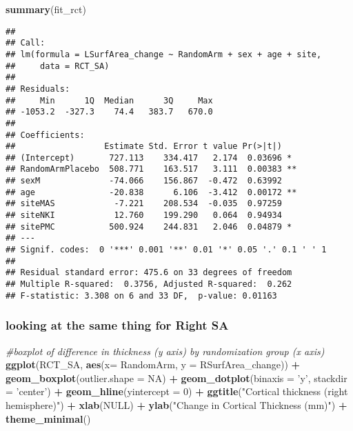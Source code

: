 \documentclass[]{article}
\newenvironment{Shaded}{\begin{snugshade}}{\end{snugshade}}
\newcommand{\KeywordTok}[1]{\textcolor[rgb]{0.13,0.29,0.53}{\textbf{#1}}}
\newcommand{\DataTypeTok}[1]{\textcolor[rgb]{0.13,0.29,0.53}{#1}}
\newcommand{\DecValTok}[1]{\textcolor[rgb]{0.00,0.00,0.81}{#1}}
\newcommand{\StringTok}[1]{\textcolor[rgb]{0.31,0.60,0.02}{#1}}
\newcommand{\CommentTok}[1]{\textcolor[rgb]{0.56,0.35,0.01}{\textit{#1}}}
\newcommand{\OtherTok}[1]{\textcolor[rgb]{0.56,0.35,0.01}{#1}}
\newcommand{\OperatorTok}[1]{\textcolor[rgb]{0.81,0.36,0.00}{\textbf{#1}}}
\newcommand{\NormalTok}[1]{#1}
\theoremstyle{definition}
\theoremstyle{definition}
\theoremstyle{definition}
\theoremstyle{remark}
\begin{document}
\begin{Shaded}
\begin{Highlighting}[]
  \KeywordTok{summary}\NormalTok{(fit_rct)}
\end{Highlighting}
\end{Shaded}

\begin{verbatim}
## 
## Call:
## lm(formula = LSurfArea_change ~ RandomArm + sex + age + site, 
##     data = RCT_SA)
## 
## Residuals:
##     Min      1Q  Median      3Q     Max 
## -1053.2  -327.3    74.4   383.7   670.0 
## 
## Coefficients:
##                  Estimate Std. Error t value Pr(>|t|)   
## (Intercept)       727.113    334.417   2.174  0.03696 * 
## RandomArmPlacebo  508.771    163.517   3.111  0.00383 **
## sexM              -74.066    156.867  -0.472  0.63992   
## age               -20.838      6.106  -3.412  0.00172 **
## siteMAS            -7.221    208.534  -0.035  0.97259   
## siteNKI            12.760    199.290   0.064  0.94934   
## sitePMC           500.924    244.831   2.046  0.04879 * 
## ---
## Signif. codes:  0 '***' 0.001 '**' 0.01 '*' 0.05 '.' 0.1 ' ' 1
## 
## Residual standard error: 475.6 on 33 degrees of freedom
## Multiple R-squared:  0.3756, Adjusted R-squared:  0.262 
## F-statistic: 3.308 on 6 and 33 DF,  p-value: 0.01163
\end{verbatim}

\subsubsection{looking at the same thing for Right
SA}\label{looking-at-the-same-thing-for-right-sa}

\begin{Shaded}
\begin{Highlighting}[]
\CommentTok{#boxplot of difference in thickness (y axis) by randomization group (x axis)}
\KeywordTok{ggplot}\NormalTok{(RCT_SA, }\KeywordTok{aes}\NormalTok{(}\DataTypeTok{x=}\NormalTok{ RandomArm, }\DataTypeTok{y =}\NormalTok{ RSurfArea_change)) }\OperatorTok{+}\StringTok{ }
\StringTok{     }\KeywordTok{geom_boxplot}\NormalTok{(}\DataTypeTok{outlier.shape =} \OtherTok{NA}\NormalTok{) }\OperatorTok{+}\StringTok{ }
\StringTok{     }\KeywordTok{geom_dotplot}\NormalTok{(}\DataTypeTok{binaxis =} \StringTok{'y'}\NormalTok{, }\DataTypeTok{stackdir =} \StringTok{'center'}\NormalTok{) }\OperatorTok{+}
\StringTok{     }\KeywordTok{geom_hline}\NormalTok{(}\DataTypeTok{yintercept =} \DecValTok{0}\NormalTok{) }\OperatorTok{+}
\StringTok{     }\KeywordTok{ggtitle}\NormalTok{(}\StringTok{"Cortical thickness (right hemisphere)"}\NormalTok{) }\OperatorTok{+}
\StringTok{     }\KeywordTok{xlab}\NormalTok{(}\OtherTok{NULL}\NormalTok{) }\OperatorTok{+}
\StringTok{     }\KeywordTok{ylab}\NormalTok{(}\StringTok{"Change in Cortical Thickness (mm)"}\NormalTok{) }\OperatorTok{+}
\StringTok{     }\KeywordTok{theme_minimal}\NormalTok{()}
\end{Highlighting}
\end{Shaded}
\end{document}
